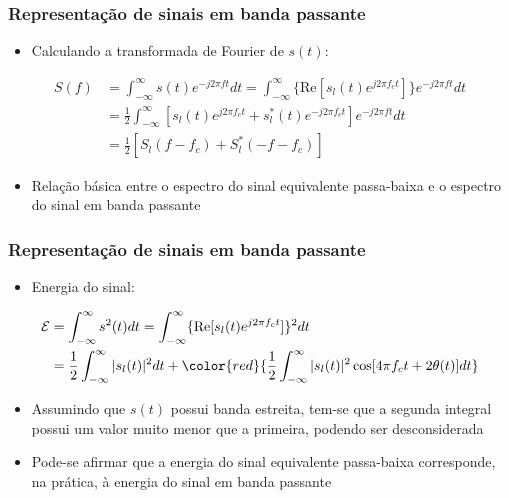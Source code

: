 \begin{frame}
	\frametitle{Representação de sinais em banda passante}

	\begin{itemize}
	 \item Calculando a transformada de Fourier de $s(t)$:
	\end{itemize}
	\begin{align*}
	    S(f) &= \int_{-\infty}^{\infty} s(t) e^{-j2\pi f t} dt = \int_{-\infty}^{\infty} \{ \mathrm{Re}[s_l(t) e^{j2\pi f_c t}] \} e^{-j2\pi f t} dt \\
	    &= \frac{1}{2} \int_{-\infty}^{\infty} [ s_l(t) e^{j2\pi f_c t} + s_l^*(t) e^{-j2\pi f_c t} ] e^{-j2\pi f t} dt \\
	    &= \frac{1}{2} [ S_l(f -f_c) + S_l^*(-f -f_c) ]
	\end{align*}
	\begin{itemize}
	 \item Relação básica entre o espectro do sinal equivalente passa-baixa e o espectro do sinal em banda passante
	\end{itemize}

\end{frame}

\begin{frame}
	\frametitle{Representação de sinais em banda passante}

	\begin{itemize}
	 \item Energia do sinal:
	\end{itemize}
	\begin{align*}
	    \mathcal{E} &= \int_{-\infty}^{\infty} s^2(t) dt = \int_{-\infty}^{\infty} \{ \mathrm{Re}[s_l(t)e^{j2\pi f_c t}] \}^2 dt \\
	    &= \frac{1}{2} \int_{-\infty}^{\infty} |s_l(t)|^2 dt + \color{red}{\frac{1}{2} \int_{-\infty}^{\infty} |s_l(t)|^2 \cos [4\pi f_c t + 2\theta(t)] dt}
	\end{align*}
	\begin{itemize}
	  \item Assumindo que $s(t)$ possui banda estreita, tem-se que a segunda integral possui um valor muito menor que a primeira, podendo ser desconsiderada
	  \item Pode-se afirmar que a energia do sinal equivalente passa-baixa corresponde, na prática, à energia do sinal em banda passante
	\end{itemize}

\end{frame}

